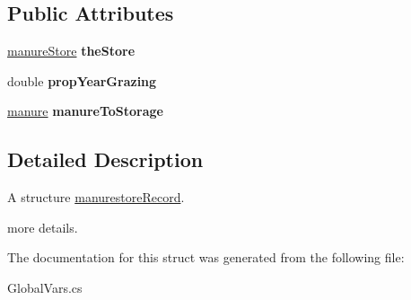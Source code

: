 \subsection*{Public Attributes}
\begin{DoxyCompactItemize}
\item 
\mbox{\label{struct_global_vars_1_1manurestore_record_a2f44c69503f740a600e7d7e952d5b392}} 
\mbox{\hyperlink{classmanure_store}{manure\+Store}} {\bfseries the\+Store}
\item 
\mbox{\label{struct_global_vars_1_1manurestore_record_aac39b4452d3d81cab1bf310fc4f19514}} 
double {\bfseries prop\+Year\+Grazing}
\item 
\mbox{\label{struct_global_vars_1_1manurestore_record_a07faab94782d0887ad2bb4329df47436}} 
\mbox{\hyperlink{classmanure}{manure}} {\bfseries manure\+To\+Storage}
\end{DoxyCompactItemize}


\subsection{Detailed Description}
A structure \mbox{\hyperlink{struct_global_vars_1_1manurestore_record}{manurestore\+Record}}. 

more details. 

The documentation for this struct was generated from the following file\+:\begin{DoxyCompactItemize}
\item 
Global\+Vars.\+cs\end{DoxyCompactItemize}
